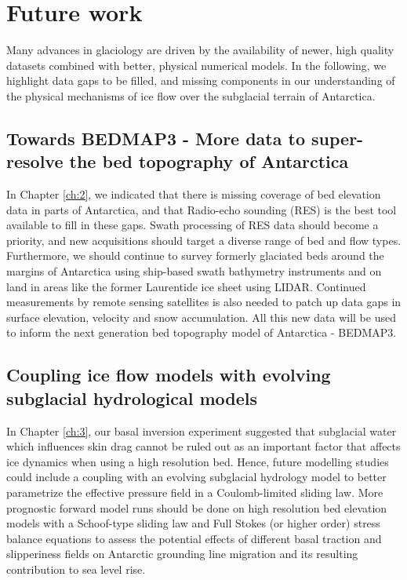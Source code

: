 \section{Future work}

Many advances in glaciology are driven by the availability of newer, high quality datasets combined with better, physical numerical models.
In the following, we highlight data gaps to be filled, and missing components in our understanding of the physical mechanisms of ice flow over the subglacial terrain of Antarctica.

\subsection{Towards BEDMAP3 - More data to super-resolve the bed topography of Antarctica}

In Chapter \ref{ch:2}, we indicated that there is missing coverage of bed elevation data in parts of Antarctica, and that Radio-echo sounding (\gls{RES}) is the best tool available to fill in these gaps.
Swath processing of RES data \citep[e.g.][]{HolschuhLinkingpostglaciallandscapes2020} should become a priority, and new acquisitions should target a diverse range of bed and flow types.
Furthermore, we should continue to survey formerly glaciated beds around the margins of Antarctica using ship-based swath bathymetry instruments and on land in areas like the former Laurentide ice sheet using LIDAR.
Continued measurements by remote sensing satellites is also needed to patch up data gaps in surface elevation, velocity and snow accumulation.
All this new data will be used to inform the next generation bed topography model of Antarctica - BEDMAP3.

\subsection{Coupling ice flow models with evolving subglacial hydrological models}

In Chapter \ref{ch:3}, our basal inversion experiment suggested that subglacial water which influences skin drag cannot be ruled out as an important factor that affects ice dynamics when using a high resolution bed.
Hence, future modelling studies could include a coupling with an evolving subglacial hydrology model \citep[e.g.][]{SommersSHAKTISubglacialHydrology2018} to better parametrize the effective pressure field in a Coulomb-limited sliding law.
More prognostic forward model runs should be done on high resolution bed elevation models with a Schoof-type sliding law and Full Stokes (or higher order) stress balance equations to assess the potential effects of different basal traction and slipperiness fields on Antarctic grounding line migration and its resulting contribution to sea level rise.

